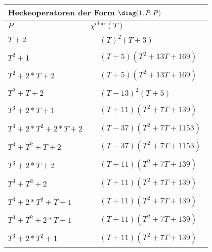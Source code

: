 \begin{tabular}{| l | l |}
\multicolumn{2}{l}{\bf Heckeoperatoren der Form $\diag(1,P,P)$} \\
\hline
$P$ & $\chi^\text{char}(T)$ \\
\hline
$T + 2$ &
$\!\begin{aligned}
	&(T)^{2}(T + 3)\end{aligned}$ \\
\hline
$T^2 + 1$ &
$\!\begin{aligned}
	&(T + 5)(T^{2} + 13T + 169)\end{aligned}$ \\
\hline
$T^2 + 2*T + 2$ &
$\!\begin{aligned}
	&(T + 5)(T^{2} + 13T + 169)\end{aligned}$ \\
\hline
$T^2 + T + 2$ &
$\!\begin{aligned}
	&(T - 13)^{2}(T + 5)\end{aligned}$ \\
\hline
$T^3 + 2*T + 1$ &
$\!\begin{aligned}
	&(T + 11)(T^{2} + 7T + 139)\end{aligned}$ \\
\hline
$T^3 + 2*T^2 + 2*T + 2$ &
$\!\begin{aligned}
	&(T - 37)(T^{2} + 7T + 1153)\end{aligned}$ \\
\hline
$T^3 + T^2 + T + 2$ &
$\!\begin{aligned}
	&(T - 37)(T^{2} + 7T + 1153)\end{aligned}$ \\
\hline
$T^3 + 2*T + 2$ &
$\!\begin{aligned}
	&(T + 11)(T^{2} + 7T + 139)\end{aligned}$ \\
\hline
$T^3 + T^2 + 2$ &
$\!\begin{aligned}
	&(T + 11)(T^{2} + 7T + 139)\end{aligned}$ \\
\hline
$T^3 + 2*T^2 + T + 1$ &
$\!\begin{aligned}
	&(T + 11)(T^{2} + 7T + 139)\end{aligned}$ \\
\hline
$T^3 + T^2 + 2*T + 1$ &
$\!\begin{aligned}
	&(T + 11)(T^{2} + 7T + 139)\end{aligned}$ \\
\hline
$T^3 + 2*T^2 + 1$ &
$\!\begin{aligned}
	&(T + 11)(T^{2} + 7T + 139)\end{aligned}$ \\
\hline
\end{tabular}


